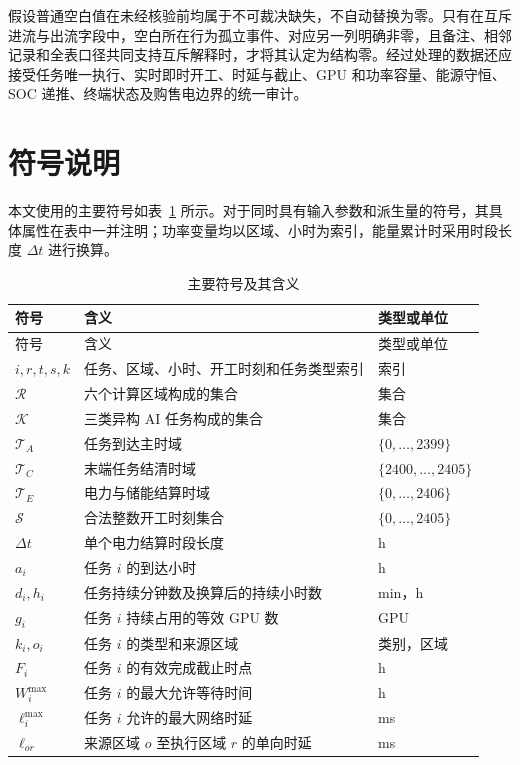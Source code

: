 \documentclass[withoutpreface,bwprint]{cumcmthesis}
\begin{document}
假设普通空白值在未经核验前均属于不可裁决缺失，不自动替换为零。只有在互斥进流与出流字段中，空白所在行为孤立事件、对应另一列明确非零，且备注、相邻记录和全表口径共同支持互斥解释时，才将其认定为结构零。经过处理的数据还应接受任务唯一执行、实时即时开工、时延与截止、GPU 和功率容量、能源守恒、SOC 递推、终端状态及购售电边界的统一审计。

\section{符号说明}

本文使用的主要符号如表~\ref{tab:symbols} 所示。对于同时具有输入参数和派生量的符号，其具体属性在表中一并注明；功率变量均以区域、小时为索引，能量累计时采用时段长度 $\Delta t$ 进行换算。

\small
\begin{longtable}{lll}
\caption{主要符号及其含义}
\label{tab:symbols}\\
\toprule
符号 & 含义 & 类型或单位 \\
\midrule
\endfirsthead
\toprule
符号 & 含义 & 类型或单位 \\
\midrule
\endhead
\bottomrule
\endfoot
$i,r,t,s,k$ & 任务、区域、小时、开工时刻和任务类型索引 & 索引 \\
$\mathcal R$ & 六个计算区域构成的集合 & 集合 \\
$\mathcal K$ & 三类异构 AI 任务构成的集合 & 集合 \\
$\mathcal T_A$ & 任务到达主时域 & $\{0,\ldots,2399\}$ \\
$\mathcal T_C$ & 末端任务结清时域 & $\{2400,\ldots,2405\}$ \\
$\mathcal T_E$ & 电力与储能结算时域 & $\{0,\ldots,2406\}$ \\
$\mathcal S$ & 合法整数开工时刻集合 & $\{0,\ldots,2405\}$ \\
$\Delta t$ & 单个电力结算时段长度 & h \\
$a_i$ & 任务 $i$ 的到达小时 & h \\
$d_i,h_i$ & 任务持续分钟数及换算后的持续小时数 & min，h \\
$g_i$ & 任务 $i$ 持续占用的等效 GPU 数 & GPU \\
$k_i,o_i$ & 任务 $i$ 的类型和来源区域 & 类别，区域 \\
$F_i$ & 任务 $i$ 的有效完成截止时点 & h \\
$W_i^{\max}$ & 任务 $i$ 的最大允许等待时间 & h \\
$\ell_i^{\max}$ & 任务 $i$ 允许的最大网络时延 & ms \\
$\ell_{or}$ & 来源区域 $o$ 至执行区域 $r$ 的单向时延 & ms \\

\end{longtable}
\end{document}
